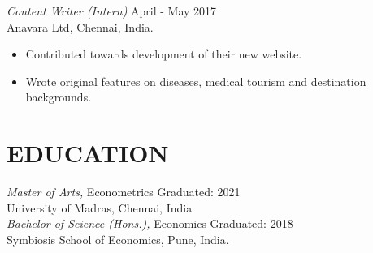 \documentclass[margin]{res}
\begin{document}
\begin{resume}
{\sl Content Writer (Intern)} 					\hfill April - May 2017\\
Anavara Ltd, Chennai, India.
\begin{itemize}  \itemsep -2pt %
	\item Contributed towards development of their new website.
	\item Wrote original features on diseases, medical tourism and destination backgrounds.
\end{itemize}

\section{EDUCATION}

				{\sl Master of Arts,} Econometrics 					\hfill Graduated: 2021\\
				University of Madras, Chennai, India \vspace{2mm}\\
				{\sl Bachelor of Science (Hons.),}  Economics  \hfill Graduated: 2018\\             				Symbiosis School of Economics, Pune, India.
                


\end{resume}
\end{document}
